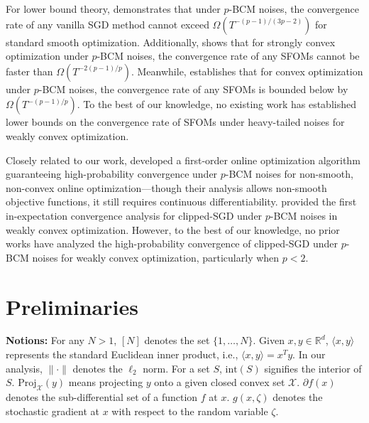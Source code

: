 \documentclass{article}
\def \intdom {\text{int}}
\begin{document}
For lower bound theory, \cite{zhang_2020} demonstrates that under $p$-BCM noises, the convergence rate of any vanilla SGD method cannot exceed $\Omega(T^{-(p-1)/(3p-2)})$ for standard smooth optimization. Additionally, \cite{zhang_2020} shows that for strongly convex optimization under $p$-BCM noises, the convergence rate of any SFOMs cannot be faster than $\Omega(T^{-2(p-1)/p})$. Meanwhile, \cite{vural2022mirrordescentstrikesagain} establishes that for convex optimization under $p$-BCM noises, the convergence rate of any SFOMs is bounded below by $\Omega(T^{-(p-1)/p})$. To the best of our knowledge, no existing work has established lower bounds on the convergence rate of SFOMs under heavy-tailed noises for weakly convex optimization.

Closely related to our work, \cite{LiuLangqi_2024} developed a first-order online optimization algorithm guaranteeing high-probability convergence under $p$-BCM noises for non-smooth, non-convex online optimization—though their analysis allows non-smooth objective functions, it still requires continuous differentiability. \cite{hu_2025} provided the first in-expectation convergence analysis for clipped-SGD under $p$-BCM noises in weakly convex optimization. However, to the best of our knowledge, no prior works have analyzed the high-probability convergence of clipped-SGD under $p$-BCM noises for weakly convex optimization, particularly when $p < 2$. 

\section{Preliminaries}  
\textbf{Notions:} For any $N > 1$, $[N]$ denotes the set $\{1, \dots, N\}$. Given $x, y \in \mathbb{R}^d$, $\langle x, y \rangle$ represents the standard Euclidean inner product, i.e., $\langle x, y \rangle = x^T y$. In our analysis, $\|\cdot\|$ denotes the $\ell_2$ norm. For a set $S$, $\intdom(S)$ signifies the interior of $S$. $\textrm{Proj}_\mathcal{X}(y)$ means projecting $y$ onto a given closed convex set $\mathcal{X}$. $\partial f(x)$ denotes the sub-differential set of a function $f$ at $x$. $g(x, \zeta)$ denotes the stochastic gradient at $x$ with respect to the random variable $\zeta$.
\end{document}
